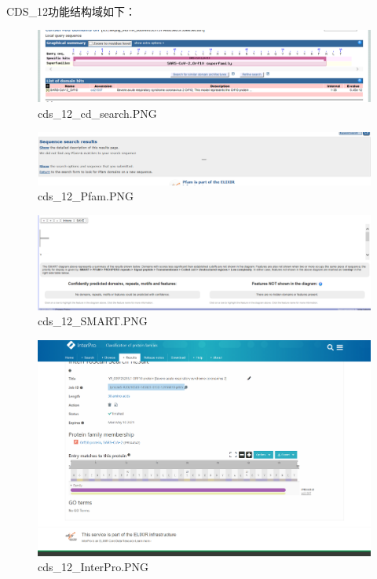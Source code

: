\documentclass[supercite]{HustGraduPaper}
\begin{document}
	\paragraph{}\label{subpara:subpara}CDS\_12功能结构域如下：
	\begin{figure}[H]
		\centering
		\includegraphics[width=1\textwidth]{./material/practice2/cds_12/cd_search.png}
		\caption{cds\_12\_cd\_search.PNG}
	\end{figure}
	\begin{figure}[H]
		\centering
		\includegraphics[width=1\textwidth]{./material/practice2/cds_12/Pfam.png}
		\caption{cds\_12\_Pfam.PNG}
	\end{figure}
	\begin{figure}[H]
		\centering
		\includegraphics[width=1\textwidth]{./material/practice2/cds_12/SMART.png}
		\caption{cds\_12\_SMART.PNG}
	\end{figure}
	\begin{figure}[H]
		\centering
		\includegraphics[width=1\textwidth]{./material/practice2/cds_12/InterPro.png}
		\caption{cds\_12\_InterPro.PNG}
	\end{figure}
\end{document}

